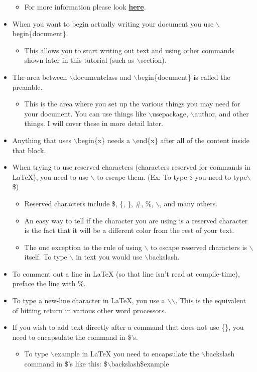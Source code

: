 \documentclass{article}
\begin{document}
\begin{itemize}
\begin{tabularx}{\textwidth}{|l|X|}
				\hline
			\end{tabularx}
			\begin{itemize}
				\item For more information please look \href{https://en.wikibooks.org/wiki/LaTeX/Document_Structure#Document_classes}{\textbf{here}}.
			\end{itemize}
			\item When you want to begin actually writing your document you use $\backslash$begin\{document\}.
			\begin{itemize}
				\item This allows you to start writing out text and using other commands shown later in this tutorial (such as $\backslash$section).
			\end{itemize}
			\item The area between $\backslash$documentclass and $\backslash$begin\{document\} is called the preamble.
			\begin{itemize}
				\item This is the area where you set up the various things you may need for your document. You can use things like $\backslash$usepackage, $\backslash$author, and other things. I will cover these in more detail later.
			\end{itemize}
			\item Anything that uses $\backslash$begin\{x\} needs a $\backslash$end\{x\} after all of the content inside that block.
			\item When trying to use reserved characters (characters reserved for commands in \LaTeX{}), you need to use $\backslash$ to escape them. (Ex: To type \$ you need to type$\backslash$\$)
			\begin{itemize}
				\item Reserved characters include \$, \{, \}, \#, \%, $\backslash$, and many others.
				\item An easy way to tell if the character you are using is a reserved character is the fact that it will be a different color from the rest of your text.
				\item The one exception to the rule of using $\backslash$ to escape reserved characters is $\backslash$ itself. To type $\backslash$ in text you would use $\backslash$backslash.
			\end{itemize}
			\item To comment out a line in \LaTeX{} (so that line isn\rq{}t read at compile-time), preface the line with \%.
			\item To type a new-line character in \LaTeX{}, you use a $\backslash$$\backslash$. This is the equivalent of hitting return in various other word processors.
			\item If you wish to add text directly after a command that does not use \{\}, you need to encapsulate the command in \$\rq{}s.
			\begin{itemize}
				\item To type $\backslash$example in \LaTeX{} you need to encapsulate the $\backslash$backslash command in \$\rq{}s like this: \$$\backslash$backslash\$example
			\end{itemize}
		\end{itemize}
	
\end{document}
